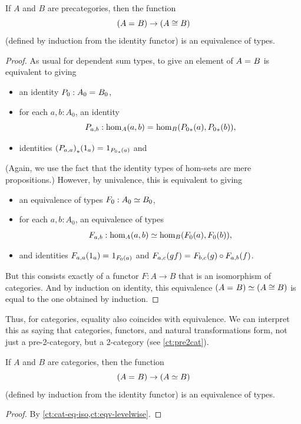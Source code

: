 \begin{lem}\label{ct:cat-eq-iso}
  If $A$ and $B$ are precategories, then the function
  \[(A =_{} B) \to (A\cong B)\]
  (defined by induction from the identity functor) is an equivalence of types.
\end{lem}
\begin{proof}
  As usual for dependent sum types, to give an element of $A =_{} B$ is equivalent to giving
  \begin{itemize}
  \item an identity $P_0:A_0 =_{} B_0$,
  \item for each $a,b:A_0$, an identity
    \[P_{a,b}:\hom_A(a,b) =_{} \hom_B({P_0}_{*}\mathopen{}\left({a}\right)\mathclose{},{P_0}_{*}\mathopen{}\left({b}\right)\mathclose{}),\]
  \item identities ${(P_{a,a})}_{*}\mathopen{}\left({1_a}\right)\mathclose{} =_{} 1_{{P_0}_{*}\mathopen{}\left({a}\right)\mathclose{}}$ and
  \end{itemize}
  (Again, we use the fact that the identity types of hom-sets are mere propositions.)
  However, by univalence, this is equivalent to giving
  \begin{itemize}
  \item an equivalence of types $F_0:A_0 \simeq B_0$,
  \item for each $a,b:A_0$, an equivalence of types
    \[F_{a,b}:\hom_A(a,b) \simeq \hom_B(F_0 (a),F_0 (b)),\]
  \item and identities $F_{a,a}(1_a) =_{} 1_{F_0 (a)}$ and $F_{a,c}(gf) =_{} F_{b,c} (g)\circ F_{a,b} (f)$.
  \end{itemize}
  But this consists exactly of a functor $F:A\to B$ that is an isomorphism of categories.
  And by induction on identity, this equivalence $(A =_{} B) \simeq (A\cong B)$ is equal to the one obtained by induction.
\end{proof}

Thus, for categories, equality also coincides with equivalence.
We can interpret this as saying that categories, functors, and natural transformations form, not just a pre-2-category, but a 2-category (see \cref{ct:pre2cat}).

\begin{thm}\label{ct:cat-2cat}
  If $A$ and $B$ are categories, then the function
  \[(A =_{} B) \to (A \simeq B)\]
  (defined by induction from the identity functor) is an equivalence of types.
\end{thm}
\begin{proof}
  By \cref{ct:cat-eq-iso,ct:eqv-levelwise}.
\end{proof}

